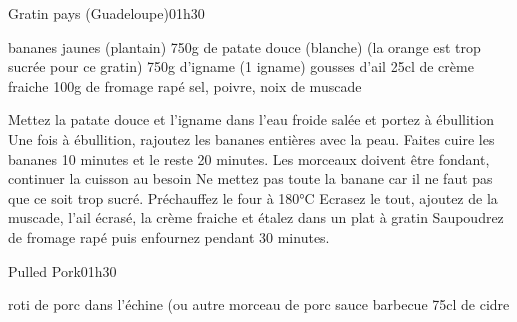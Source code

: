 {\renewcommand{\section}[1]{}

\section{Gratin pays (Guadeloupe)}
\begin{recette}{Gratin pays (Guadeloupe)}{0}{1h30}{}
\begin{ingredients}
 bananes jaunes (plantain)
\ingredient 750g de patate douce (blanche) (la orange est trop sucrée pour ce gratin)
\ingredient 750g d'igname (1 igname)
 gousses d'ail
\ingredient 25cl de crème fraiche %
\ingredient 100g de fromage rapé
\ingredient sel, poivre, noix de muscade
\end{ingredients}

\begin{preparation}
\etape Mettez la patate douce et l'igname dans l'eau froide salée et portez à ébullition
\etape Une fois à ébullition, rajoutez les bananes entières avec la peau. Faites cuire les bananes 10 minutes et le reste 20 minutes. Les morceaux doivent être fondant, continuer la cuisson au besoin
\etape Ne mettez pas toute la banane car il ne faut pas que ce soit trop sucré. 
\etape Préchauffez le four à 180°C
\etape Ecrasez le tout, ajoutez de la muscade, l'ail écrasé, la crème fraiche et étalez dans un plat à gratin
\etape Saupoudrez de fromage rapé puis enfournez pendant 30 minutes.
\end{preparation}
\end{recette}

\section{Pulled Pork}
\begin{recette}{Pulled Pork}{0}{1h30}{}
\begin{ingredients}
\ingredient roti de porc dans l'échine (ou autre morceau de porc
\ingredient sauce barbecue
\ingredient 75cl de cidre
\end{ingredients}


\end{recette}}
